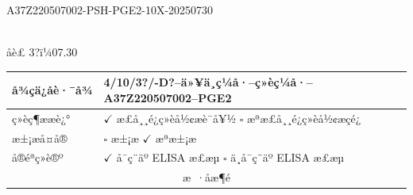 \documentclass[UTF8,10pt,a4paper,fontset=fandol]{ctexart}
\newcommand{\fieldvalue}[1]{#1}
\newcommand{\handwritten}[1]{#1}
\begin{document}
\noindent
\fieldvalue{A37Z220507002-PSH-PGE2-10X-20250730}

\vspace{1mm}
\begin{center}
\fbox{\rule{0pt}{42mm}\rule{0.43\textwidth}{0pt}}\\[-1mm]
\handwritten{åè£ 3?ï¼07.30}
\end{center}

\noindent
\begin{tabularx}{\textwidth}{|p{}|X|}
\hline
å¾çä¿å­è·¯å¾ &
\fieldvalue{\handwritten{4/10/3?/-D?--ä»¥ä¸ç¼å·--ç»èç¼å·--A37Z220507002--PGE2}}
\\
\hline
ç»èç¶ææè¿° &
\fieldvalue{\(\checkmark\) æ­£å¸¸é¿ç»èå½¢æè¯å¥½ \quad $\square$ æªæ­£å¸¸é¿ç»èå½¢æçé¿}
\\
\hline
æ±¡æå¤å® &
$\square$ æ±¡æ \quad
\fieldvalue{\(\checkmark\) æªæ±¡æ}
\\
\hline
å®éªç»è®º &
\fieldvalue{\(\checkmark\) å¯ç¨äº ELISA æ£æµ}
\quad $\square$ ä¸å¯ç¨äº ELISA æ£æµ
\\
\hline
\multicolumn{2}{|c|}{æ ·åæ¶é}\\
\hline
\end{tabularx}
\end{document}
